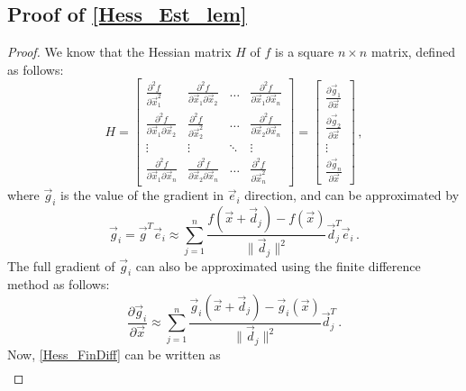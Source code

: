 \subsection*{Proof of \cref{Hess_Est_lem}} 

\primelemma*

\begin{proof}
We know that the Hessian matrix $H$ of $f$ is a square $n \times n$ matrix, defined as follows:
\begin{equation} \label{Hess_FinDiff}
 H = \begin{bmatrix} \frac{\partial^2 f}{\partial \vec{x}_1^2} & \frac{\partial^2 f}{\partial \vec{x}_1 \partial \vec{x}_2} & \hdots & \frac{\partial^2 f}{\partial \vec{x}_1 \partial \vec{x}_n} \\  \frac{\partial^2 f}{\partial \vec{x}_1 \partial \vec{x}_2} & \frac{\partial^2 f}{\partial \vec{x}_2^2} & \hdots & \frac{\partial^2 f}{\partial \vec{x}_2 \partial \vec{x}_n} \\ \vdots & \vdots & \ddots & \vdots \\ \frac{\partial^2 f}{\partial \vec{x}_1 \partial \vec{x}_n} & \frac{\partial^2 f}{\partial \vec{x}_2 \partial \vec{x}_n} & \hdots & \frac{\partial^2 f}{\partial \vec{x}_n^2}\end{bmatrix} = \begin{bmatrix} \frac{\partial \vec{g}_1}{\partial \vec{x}}  \\  \frac{\partial \vec{g}_2}{\partial \vec{x}}  \\ \vdots \\ \frac{\partial \vec{g}_n}{\partial \vec{x}} \end{bmatrix} \,,
\end{equation} 
where $\vec{g}_i$ is the value of the gradient in $\vec{e}_i$ direction, and can be approximated by
$$ \vec{g}_i = \vec{g}^T \vec{e}_i \approx \sum_{j=1}^n \frac{f(\vec{x}+\vec{d}_j) - f(\vec{x})}{\| \vec{d}_j \|^2} \vec{d}_j^T \vec{e}_i \,.$$
The full gradient of $\vec{g}_i$ can also be approximated using the finite difference method as follows:
$$ \frac{\partial \vec{g}_i}{\partial \vec{x}} \approx \sum_{j=1}^n \frac{\vec{g}_i(\vec{x}+\vec{d}_j) - \vec{g}_i (\vec{x})}{\| \vec{d}_j \|^2} \vec{d}_j^T \,.$$
Now, \eqref{Hess_FinDiff} can be written as
\begin{equation} 
\begin{aligned}

\end{aligned}
\end{equation}
\end{proof}

